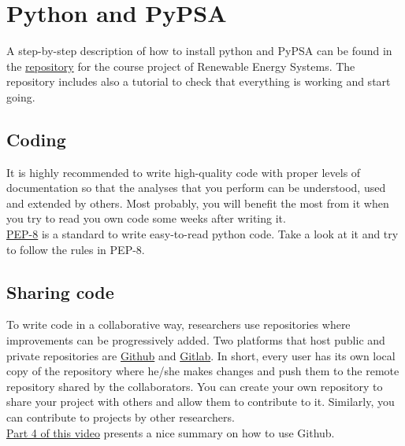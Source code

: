 \documentclass[3p]{elsarticle} %
\begin{document}
\section{Python and PyPSA}

A step-by-step description of how to install python and PyPSA can be found in the \href{https://github.com/martavp/RES_project/blob/master/Instructions_RES_project.pdf}{repository} for the course project of Renewable Energy Systems. The repository includes also a tutorial to check that everything is working and start going. 

\subsection{Coding}

It is highly recommended to write high-quality code with proper levels of documentation so that the analyses that you perform can be understood, used and extended by others. Most probably, you will benefit the most from it when you try to read you own code some weeks after writing it. \\

\href{https://www.python.org/dev/peps/pep-0008/}{PEP-8} is a standard to write easy-to-read python code. Take a look at it and try to follow the rules in PEP-8.

\subsection{Sharing code}

To write code in a collaborative way, researchers use repositories where improvements can be progressively added. Two platforms that host public and private repositories are \href{https:\\github.com}{Github} and \href{https:\\gitlab.com}{Gitlab}. In short, every user has its own local copy of the repository where he/she makes changes and push them to the remote repository shared by the collaborators. You can create your own repository to share your project with others and allow them to contribute to it. Similarly, you can contribute to projects by other researchers.\\
\href{https://data.ene.iiasa.ac.at/teaching/osesm_2020_lecture_1_recording.html}{Part 4 of this video} presents a nice summary on how to use Github. 


\end{document}

